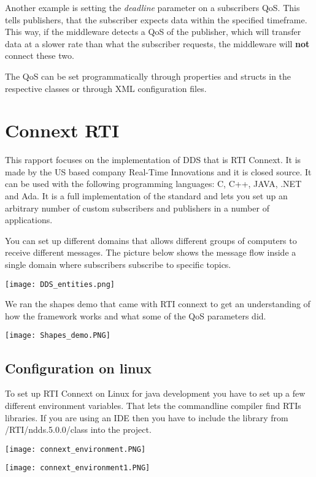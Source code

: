 Another example is setting the \textit{deadline} parameter on a subscribers QoS. This tells publishers, that the subscriber expects data within the specified timeframe. This way, if the middleware detects a QoS of the publisher, which will transfer data at a slower rate than what the subscriber requests, the middleware will \textbf{not} connect these two.

The QoS can be set programmatically through properties and structs in the respective classes or through XML configuration files. 


\section{Connext RTI}
This rapport focuses on the implementation of DDS that is RTI Connext. It is made by the US based company Real-Time Innovations and it is closed source. It can be used with the following programming languages: C, C++, JAVA, .NET and Ada. 
It is a full implementation of the standard and lets you set up an arbitrary number of custom subscribers and publishers in a number of applications.

You can set up different domains that allows different groups of computers to receive different messages. The picture below shows the message flow inside a single domain where subscribers subscribe to specific topics.

\begin{center}
	\texttt{[image: DDS\_entities.png]}
\end{center}

We ran the shapes demo that came with RTI connext to get an understanding of how the framework works and what some of the QoS parameters did.

\begin{center}
	\texttt{[image: Shapes\_demo.PNG]}
\end{center}

\subsection{Configuration on linux}

To set up RTI Connext on Linux for java development you have to set up a few different environment variables. That lets the commandline compiler find RTIs libraries. If you are using an IDE then you have to include the library from /RTI/ndds.5.0.0/class into the project.

\begin{center}
	\texttt{[image: connext\_environment.PNG]}
\end{center}

\begin{center}
	\texttt{[image: connext\_environment1.PNG]}
\end{center}
